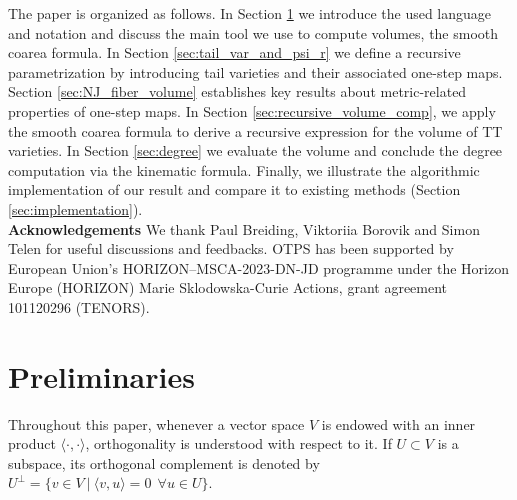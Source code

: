 \documentclass{article}
\theoremstyle{definition}
\newcommand\AR[1]{\textcolor{orange}{#1}}
\newcommand\OS[1]{\textcolor{red}{#1}}
\begin{document}
The paper is organized as follows. In Section \ref{sec:preliminaries} we introduce the used language and notation and discuss the main tool we use to compute volumes, the smooth coarea formula. In Section \ref{sec:tail_var_and_psi_r} we define a recursive parametrization by introducing tail varieties and their associated one-step maps. Section \ref{sec:NJ_fiber_volume} establishes key results about metric-related properties of one-step maps. In Section \ref{sec:recursive_volume_comp}, we apply the smooth coarea formula to derive a recursive expression for the volume of TT varieties. In Section \ref{sec:degree} we evaluate the volume and conclude the degree computation via the kinematic formula. Finally, we illustrate the algorithmic implementation of our result and compare it to existing methods (Section \ref{sec:implementation}). \\


\textbf{Acknowledgements} We thank Paul Breiding, Viktoriia Borovik and Simon Telen for useful discussions and feedbacks. OTPS has been supported by European Union’s HORIZON–MSCA-2023-DN-JD programme
under the Horizon Europe (HORIZON) Marie Sklodowska-Curie Actions, grant agreement
101120296 (TENORS).  

\section{Preliminaries}\label{sec:preliminaries}


Throughout this paper, whenever a vector space $V$ is endowed with an inner product $\langle\cdot , \cdot \rangle$, orthogonality is understood with respect to it. If $U \subset V$ is a subspace, its orthogonal complement is denoted by $U^{\perp}=\{v \in V \ | \ \langle v,u\rangle=0 \ \  \forall u \in U\}$. \\
\end{document}

